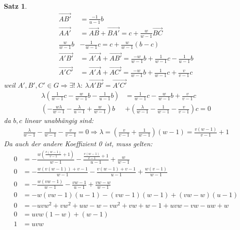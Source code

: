 \documentclass[%
a4paper,
10pt,           %
]
{scrartcl}
\newcommand{\ora}{\overrightarrow}
\theoremstyle{plain}
\theoremstyle{plain}
\newtheorem{mysatz}[mydef]{Satz}
\theoremstyle{plain}
\theoremstyle{plain}
\theoremstyle{plain}
\begin{document}
\begin{mysatz}
\begin{align*}
        \ora{AB'} & = \frac{-1}{u-1} b\\
        \ora{AA'} & = \ora{AB} + \ora{BA'} = c + \frac{w}{w-1} \ora{BC}\\
        \frac{w}{w-1} b & - \frac{1}{w-1} c = c + \frac{w}{w-1} \left( b-c \right)\\
        \ora{A'B'} & = \ora{A'A} + \ora{AB'} = \frac{-w}{w-1} b + \frac{1}{w-1} c - \frac{1}{u-1} b\\
        \ora{A'C'} & = \ora{A'A} + \ora{AC'} = \frac{-w}{w-1} b + \frac{1}{w-1} c + \frac{v}{v-1} c
    \end{align*}
    weil $A',B',C' \in G \Rightarrow \exists !\ \lambda :\ \lambda \ora{A'B'} = \ora{A'C'}$
    \begin{align*}
        \lambda \left( \frac{1}{w-1}c - \frac{w}{w-1}b - \frac{1}{u-1}b \right) & = \frac{1}{w-1}c - \frac{w}{w-1}b + \frac{v}{v-1}c\\
        \left( -\frac{w \lambda}{w-1} - \frac{\lambda}{u-1} + \frac{w}{w-1} \right)b & + \left( \frac{\lambda}{w-1} - \frac{1}{w-1} - \frac{v}{v-1} \right)c = 0
    \end{align*}
    da $b,c$ linear unabhängig sind:
    \begin{align*}
        \frac{\lambda}{w-1} - \frac{1}{w-1} - \frac{v}{v-1} = 0 \Rightarrow \lambda = \left( \frac{v}{v-1} + \frac{1}{w-1} \right)(w-1) = \frac{v(w-1)}{v-1} +1
    \end{align*}
    Da auch der andere Koeffizient 0 ist, muss gelten:
    \begin{align*}
        0 & = - \frac{w \left( \frac{v(w-1)}{v-1} + 1 \right)}{w-1} - \frac{\frac{v(w-1)}{v-1}+1}{u-1} + \frac{w}{w-1}\\
        0 & = - \frac{w(v(w-1))+ v-1}{w-1} - \frac{v(w-1)+v-1}{u-1} + \frac{w(v-1)}{w-1}\\
        0 & = - \frac{w(vw-1)}{w-1} - \frac{vw-1}{u-1} + \frac{vw-w}{w-1}\\
        0 & = -w(vw-1)(u-1) - (vw-1)(w-1) + (vw-w)(u-1)\\
        0 & = -uvw^2+vw^2+uw-w-vw^2+vw+w-1+uvw-vw-uw+w\\
        0 & = uvw(1-w)+(w-1)\\
        1 & = uvw
    \end{align*}
\end{mysatz}
\end{document}
